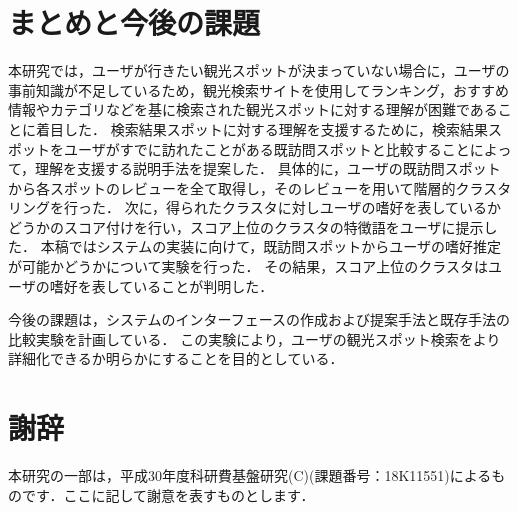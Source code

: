 \documentclass{deimj}
\begin{document}
\section{まとめと今後の課題}
\label{sec:まとめと今後の課題}

本研究では，ユーザが行きたい観光スポットが決まっていない場合に，ユーザの事前知識が不足しているため，観光検索サイトを使用してランキング，おすすめ情報やカテゴリなどを基に検索された観光スポットに対する理解が困難であることに着目した．
検索結果スポットに対する理解を支援するために，検索結果スポットをユーザがすでに訪れたことがある既訪問スポットと比較することによって，理解を支援する説明手法を提案した．
具体的に，ユーザの既訪問スポットから各スポットのレビューを全て取得し，そのレビューを用いて階層的クラスタリングを行った．
次に，得られたクラスタに対しユーザの嗜好を表しているかどうかのスコア付けを行い，スコア上位のクラスタの特徴語をユーザに提示した．
本稿ではシステムの実装に向けて，既訪問スポットからユーザの嗜好推定が可能かどうかについて実験を行った．
その結果，スコア上位のクラスタはユーザの嗜好を表していることが判明した．

今後の課題は，システムのインターフェースの作成および提案手法と既存手法の比較実験を計画している．
この実験により，ユーザの観光スポット検索をより詳細化できるか明らかにすることを目的としている．

\section*{謝辞}
本研究の一部は，平成30年度科研費基盤研究(C)(課題番号：18K11551)によるものです．ここに記して謝意を表すものとします．
\end{document}
